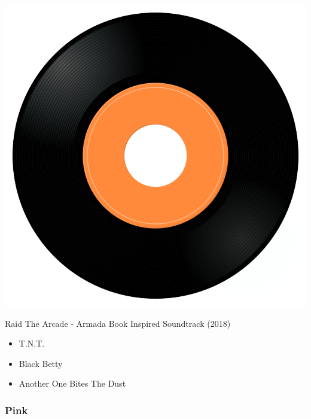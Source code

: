\begin{minipage}[t]{0.25\textwidth}\vspace{0pt}
\captionsetup{type=figure}
\includegraphics[width=\textwidth]{Images/cover.png}
\caption*{Raid The Arcade - Armada Book Inspired Soundtrack (2018)}
\end{minipage}
\begin{minipage}[t]{0.25\textwidth}\vspace{0pt}
\begin{itemize}[nosep,leftmargin=1em,labelwidth=*,align=left]
	\setlength{\itemsep}{0pt}
	\item T.N.T.
	\item Black Betty 
	\item Another One Bites The Dust
\end{itemize}
\end{minipage}

\subsubsection{Pink}

